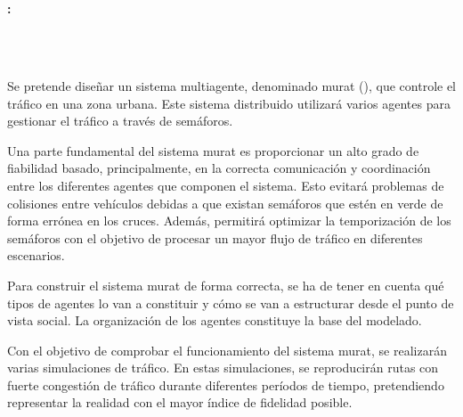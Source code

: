 \chapter*{}

\thispagestyle{empty}

\begin{center}
   {\large\bfseries \myTitleShort: \myTitle}
\end{center}

\begin{center}
    {\myName}
\end{center}

\\

    \vspace{0.7cm}

\\

Se pretende diseñar un sistema multiagente, denominado \acrshort{murat} (\myTitle), que controle el tráfico en una zona urbana. Este sistema distribuido utilizará varios agentes para gestionar el tráfico a través de semáforos. 

Una parte fundamental del sistema \acrshort{murat} es proporcionar un alto grado de fiabilidad basado, principalmente, en la correcta comunicación y coordinación entre los diferentes agentes que componen el sistema. Esto evitará problemas de colisiones entre vehículos debidas a que existan semáforos que estén en verde de forma errónea en los cruces. Además, permitirá optimizar la temporización de los semáforos con el objetivo de procesar un mayor flujo de tráfico en diferentes escenarios.

Para construir el sistema \acrshort{murat} de forma correcta, se ha de tener en cuenta qué tipos de agentes lo van a constituir y cómo se van a estructurar desde el punto de vista social. La organización de los agentes constituye la base del modelado.

Con el objetivo de comprobar el funcionamiento del sistema \acrshort{murat}, se realizarán varias simulaciones de tráfico. En estas simulaciones, se reproducirán rutas con fuerte congestión de tráfico durante diferentes períodos de tiempo, pretendiendo representar la realidad con el mayor índice de fidelidad posible.

